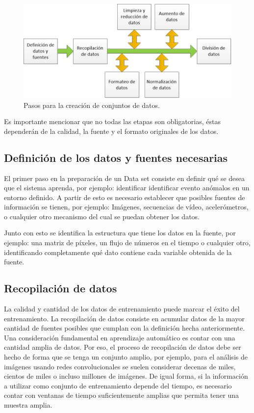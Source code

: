     \begin{figure}[ht!]
    	\centering
    	\includegraphics[width=0.8\linewidth]{imgs/02-Referential/02-dataset-steps.png}
    	\caption[Pasos para la creación de conjuntos de datos.]{Pasos para la creación de conjuntos de datos.}
	    \label{fig:DatasetSteps}
    \end{figure}%
    
    Es importante mencionar que no todas las etapas son obligatorias, éstas dependerán de la calidad, la fuente y el formato originales de los datos.
    
    \subsection{Definición de los datos y fuentes necesarias}
        El primer paso en la preparación de un Data set consiste en definir qué se desea que el sistema aprenda, por ejemplo: identificar identificar evento anómalos en un entorno definido. A partir de esto es necesario establecer que posibles fuentes de información se tienen, por ejemplo: Imágenes, secuencias de vídeo, acelerómetros, o cualquier otro mecanismo del cual se puedan obtener los datos. 
        
        Junto con esto se identifica la estructura que tiene los datos en la fuente, por ejemplo: una matriz de píxeles, un flujo de números en el tiempo o cualquier otro, identificando completamente qué dato contiene cada variable obtenida de la fuente.
        
    \subsection{Recopilación de datos}
        La calidad y cantidad de los datos de entrenamiento puede marcar el éxito del entrenamiento. La recopilación de datos consiste en acumular datos de la mayor cantidad de fuentes posibles que cumplan con la definición hecha anteriormente. Una consideración fundamental en aprendizaje automático es contar con una cantidad amplia de datos. Por eso, el proceso de recopilación de datos debe ser hecho de forma que se tenga un conjunto amplio, por ejemplo, para el análisis de imágenes usando redes convolucionales se suelen considerar decenas de miles, cientos de miles o incluso millones de imágenes. De igual forma, si la información a utilizar como conjunto de entrenamiento depende del tiempo, es necesario contar con ventanas de tiempo suficientemente amplias que permita tener una muestra amplia.
        
